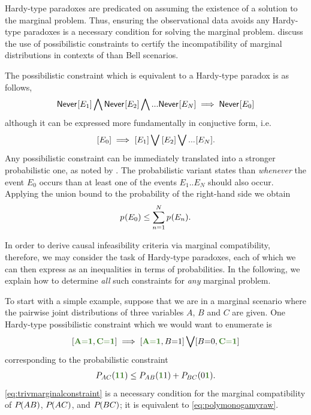 Hardy-type paradoxes are predicated on assuming the existence of a solution to the marginal problem. Thus, ensuring the observational data avoids any Hardy-type paradoxes is a necessary condition for solving the marginal problem. \citet[Section~III.C]{LSW} discuss the use of possibilistic constraints to certify the incompatibility of marginal distributions in contexts of than Bell scenarios.

The possibilistic constraint which is equivalent to a Hardy-type paradox is as follows,
\begin{align}
    {\operatorname{\mathsf{Never}}_{}}\lbrack E_1\rbrack \bigwedge {\operatorname{\mathsf{Never}}_{}}\lbrack E_2\rbrack \bigwedge ... {\operatorname{\mathsf{Never}}_{}}\lbrack E_N\rbrack \implies {\operatorname{\mathsf{Never}}_{}}\lbrack E_0\rbrack
\end{align}
although it can be expressed more fundamentally in conjuctive form, i.e.
\begin{align}
    {\operatorname{\mathsf{}}_{}}\lbrack E_0\rbrack \implies {\operatorname{\mathsf{}}_{}}\lbrack E_1\rbrack \bigvee {\operatorname{\mathsf{}}_{}}\lbrack E_2\rbrack \bigvee ... {\operatorname{\mathsf{}}_{}}\lbrack E_N\rbrack.
\end{align}
Any possibilistic constraint can be immediately translated into a stronger probabilistic one, as noted by \citet{Mansfield2012}. The probabilistic variant states than \emph{whenever} the event $E_0$ occurs than at least one of the events $E_1 .. E_N$ should also occur. Applying the union bound to the probability of the right-hand side we obtain
\begin{align}
{p_{}}\lparen E_0\rparen\leq \sum\limits_{n=1}^N{{p_{}}\lparen E_n\rparen}.
\end{align}

In order to derive causal infeasibility criteria via marginal compatibility, therefore, we may consider the task of  Hardy-type paradoxes, each of which we can then express as an inequalities in terms of probabilities. In the following, we explain how to determine \emph{all} such constraints for \emph{any} marginal problem.


To start with a simple example, suppose that we are in a marginal scenario where the pairwise joint distributions of three variables $A$, $B$ and $C$ are given.%
One Hardy-type possibilistic constraint which we would want to enumerate is
\begin{align}
   \bracks{\mgreen{A \eql 1}, \mgreen{C \eql 1}} \implies \bracks{\mgreen{A \eql 1}, B \eql 1} \bigvee \bracks{B \eql 0, \mgreen{C \eql 1}}
\end{align}
corresponding to the probabilistic constraint
\begin{align}\label{eq:trivmarginalconstraint}
	P_{AC}(\mgreen{1 1}) \leq P_{AB}(\mgreen{1} 1) + P_{BC}(0 \mgreen{1}).
\end{align}
\cref{eq:trivmarginalconstraint} is a necessary condition for the marginal compatibility of ${P_{}}\lparen A B\rparen$, ${P_{}}\lparen A C\rparen$, and ${P_{}}\lparen B C\rparen$; it is equivalent to \cref{eq:polymonogamyraw}.

